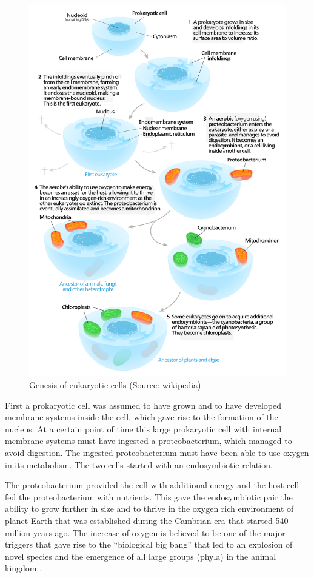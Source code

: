 \documentclass[
  11pt,
]{book}
\begin{document}
\begin{figure}

{\centering \includegraphics[width=0.8\linewidth]{./figs/endosymbiosis} 

}

\caption{Genesis of eukaryotic cells (Source: wikipedia)}\label{fig:endosymbiosis}
\end{figure}

First a prokaryotic cell was assumed to have grown and to have developed membrane systems inside the cell, which gave rise to the formation of the nucleus. At a certain point of time this large prokaryotic cell with internal membrane systems must have ingested a proteobacterium, which managed to avoid digestion. The ingested proteobacterium must have been able to use oxygen in its metabolism. The two cells started with an endosymbiotic relation.

The proteobacterium provided the cell with additional energy and the host cell fed the proteobacterium with nutrients. This gave the endosymbiotic pair the ability to grow further in size and to thrive in the oxygen rich environment of planet Earth that was established during the Cambrian era that started 540 million years ago. The increase of oxygen is believed to be one of the major triggers that gave rise to the ``biological big bang'' that led to an explosion of novel species and the emergence of all large groups (phyla) in the animal kingdom \citep{he2019}.
\end{document}
